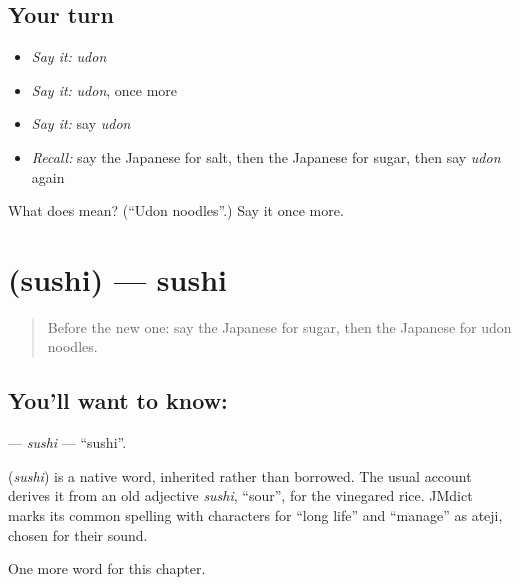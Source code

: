 \subsection*{Your turn}
\begin{itemize}
\raggedright
  \item \emph{Say it:} \emph{udon}
  \item \emph{Say it:} \emph{udon}, once more
  \item \emph{Say it:} say \emph{udon}
  \item \emph{Recall:} say the Japanese for salt, then the Japanese for sugar, then say \emph{udon} again
\end{itemize}

\begin{tcolorbox}[breakable,colback=teal!4,colframe=teal!35!black,title={Before you move on}]
What does  mean? (\textquotedblleft{}Udon noodles\textquotedblright{}.) Say it once more.
\end{tcolorbox}
\section[\texorpdfstring{\ja{すし} (sushi)}{すし (sushi)}]{ (sushi) — sushi}

\label{lesson:JA-C35-sushi}



\begin{quote}
Before the new one: say the Japanese for sugar, then the Japanese for udon noodles.
\end{quote}

\subsection*{You'll want to know: }
\textbf{} — \emph{sushi} — \textquotedblleft{}sushi\textquotedblright{}.

\begin{cousinweb}
\textbf{} (\emph{sushi}) is a native word, inherited rather than borrowed. The usual account derives it from an old adjective \emph{sushi}, \textquotedblleft{}sour\textquotedblright{}, for the vinegared rice. JMdict marks its common spelling with characters for \textquotedblleft{}long life\textquotedblright{} and \textquotedblleft{}manage\textquotedblright{} as ateji, chosen for their sound.
\end{cousinweb}

\begin{grammarlens}[title={What you've built}]
One more word for this chapter.
\end{grammarlens}

